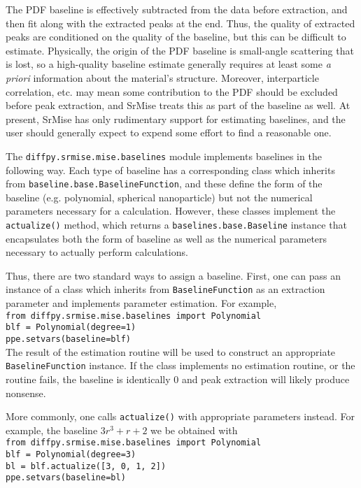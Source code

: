 \documentclass[12pt]{article}
\begin{document}
The PDF baseline is effectively subtracted from the data before extraction, and then fit along with the extracted peaks at the end.  Thus, the quality of extracted peaks are conditioned on the quality of the baseline, but this can be difficult to estimate.  Physically, the origin of the PDF baseline is small-angle scattering that is lost, so a high-quality baseline estimate generally requires at least some \emph{a priori} information about the material's structure.  Moreover, interparticle correlation, etc. may mean some contribution to the PDF should be excluded before peak extraction, and {\sc SrMise} treats this as part of the baseline as well.  At present, {\sc SrMise} has only rudimentary support for estimating baselines, and the user should generally expect to expend some effort to find a reasonable one.

The \texttt{diffpy.srmise.mise.baselines} module implements baselines in the following way.  Each type of baseline has a corresponding class which inherits from \texttt{baseline.base.BaselineFunction}, and these define the form of the baseline (e.g. polynomial, spherical nanoparticle) but not the numerical parameters necessary for a calculation.  However, these classes implement the \texttt{actualize()} method, which returns a \texttt{baselines.base.Baseline} instance that encapsulates both the form of baseline as well as the numerical parameters necessary to actually perform calculations.

Thus, there are two standard ways to assign a baseline.  First, one can pass an instance of a class which inherits from \texttt{BaselineFunction} as an extraction parameter and implements parameter estimation.  For example,\\
\texttt{from diffpy.srmise.mise.baselines import Polynomial}\\
\texttt{blf = Polynomial(degree=1)}\\
\texttt{ppe.setvars(baseline=blf)}\\
The result of the estimation routine will be used to construct an appropriate \texttt{BaselineFunction} instance.  If the class implements no estimation routine, or the routine fails, the baseline is identically 0 and peak extraction will likely produce nonsense.

More commonly, one calls \texttt{actualize()} with appropriate parameters instead.  For example, the baseline $3r^3+r+2$ we be obtained with\\
\texttt{from diffpy.srmise.mise.baselines import Polynomial}\\
\texttt{blf = Polynomial(degree=3)}\\
\texttt{bl = blf.actualize([3, 0, 1, 2])}\\
\texttt{ppe.setvars(baseline=bl)}\\
\end{document}
